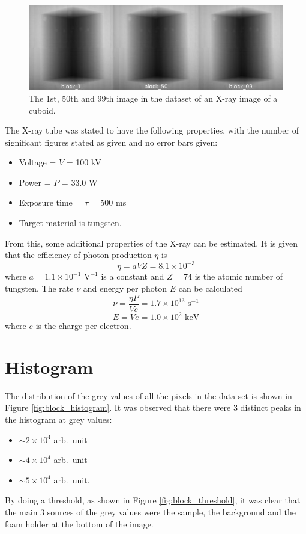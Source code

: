 \documentclass[12pt]{report}
\begin{document}
\begin{figure}[htp]
\centering
\includegraphics[width=1\textwidth]{figures/block_montage.jpg}
\caption{The 1st, 50th and 99th image in the dataset of an X-ray image of a cuboid.} 
\label{fig:block_montage}
\end{figure}

The X-ray tube was stated to have the following properties, with the number of significant figures stated as given and no error bars given:
\begin{itemize}
	\item Voltage = $V$ = 100 kV
	\item Power = $P$ = 33.0 W
	\item Exposure time = $\tau$ = 500 ms
	\item Target material is tungsten.
\end{itemize}
From this, some additional properties of the X-ray can be estimated. It is given that the efficiency of photon production $\eta$ is \cite{michael2001x}
\begin{equation}
\eta = aVZ =8.1\times10^{-3}
\end{equation}
where $a=1.1\times 10^{-1}\text{ V}^{-1}$ is a constant and $Z=74$ is the atomic number of tungsten. The rate $\nu$ and energy per photon $E$ can be calculated
\begin{equation}
\nu =\frac{\eta P}{V e}=1.7\times10^{13}\text{ s}^{-1}
\end{equation}
\begin{equation}
E = Ve = 1.0\times10^{2}\text{ keV}
\end{equation}
where $e$ is the charge per electron.

\section{Histogram}
The distribution of the grey values of all the pixels in the data set is shown in Figure \ref{fig:block_histogram}. It was observed that there were 3 distinct peaks in the histogram at grey values:
\begin{itemize}
	\item$\sim2\times10^4$ arb.~unit
	\item$\sim4\times10^4$ arb.~unit
	\item$\sim5\times10^4$ arb.~unit.
\end{itemize}
By doing a threshold, as shown in Figure \ref{fig:block_threshold}, it was clear that the main 3 sources of the grey values were the sample, the background and the foam holder at the bottom of the image.
\end{document}
